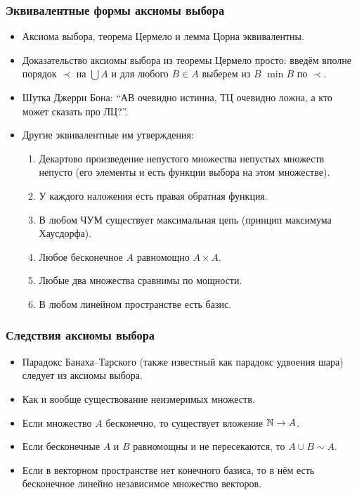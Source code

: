 \documentclass[10pt]{beamer}
\begin{document}
\begin{frame}
    \frametitle{Эквивалентные формы аксиомы выбора}
    \begin{itemize}
        \item Аксиома выбора, теорема Цермело и лемма Цорна эквивалентны.
        \item Доказательство аксиомы выбора из теоремы Цермело просто: введём вполне порядок $\prec$ на $\bigcup A$ и для любого $B \in A$ выберем из $B$ \pause $\min B$ по $\prec$.
        \item Шутка Джерри Бона: \enquote{АВ очевидно истинна, ТЦ очевидно ложна, а кто может сказать про ЛЦ?}.
        \pause
        \item Другие эквивалентные им утверждения:
        \begin{enumerate}
            \item Декартово произведение непустого множества непустых множеств непусто (его элементы и есть функции выбора на этом множестве).
            \item У каждого наложения есть правая обратная функция.
            \item В любом ЧУМ существует максимальная цепь (принцип максимума Хаусдорфа).
            \item Любое бесконечное $A$ равномощно $A \times A$.
            \item Любые два множества сравнимы по мощности.
            \item В любом линейном пространстве есть базис.
        \end{enumerate}
    \end{itemize}
\end{frame}

\begin{frame}
    \frametitle{Следствия аксиомы выбора}
    \begin{itemize}
        \item Парадокс Банаха--Тарского (также известный как парадокс удвоения шара) следует из аксиомы выбора.
        \item Как и вообще существование неизмеримых множеств.
        \item Если множество $A$ бесконечно, то существует вложение $\mathbb{N} \to A$.
        \item Если бесконечные $A$ и $B$ равномощны и не пересекаются, то $A \cup B \sim A$.
        \item Если в векторном пространстве нет конечного базиса, то в нём есть бесконечное линейно независимое множество векторов.
    \end{itemize}
\end{frame}
\end{document}
